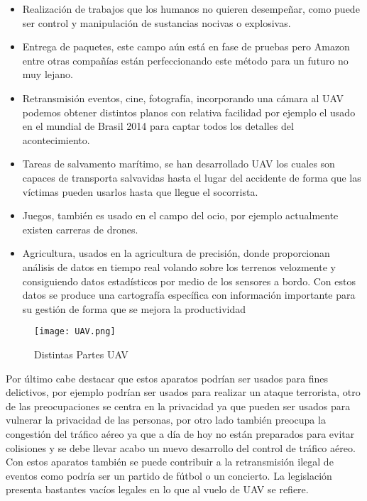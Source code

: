 \begin{itemize}
    \item Realización de trabajos que los humanos no quieren desempeñar, como puede ser control y manipulación de sustancias nocivas o explosivas.
    \item Entrega de paquetes, este campo aún está en fase de pruebas pero Amazon entre otras compañías están perfeccionando este método para un futuro no muy lejano.
    \item Retransmisión eventos, cine, fotografía, incorporando una cámara al UAV podemos obtener distintos planos con relativa facilidad por ejemplo el usado en el mundial de Brasil 2014 para captar todos los detalles del acontecimiento.
    \item Tareas de salvamento marítimo, se han desarrollado UAV los cuales son capaces de transporta salvavidas hasta el lugar del accidente de forma que las víctimas pueden usarlos hasta que llegue el socorrista.
    \item Juegos, también es usado en el campo del ocio, por ejemplo actualmente existen carreras de drones.
    \item Agricultura, usados en la agricultura de precisión, donde proporcionan análisis de datos en tiempo real volando sobre los terrenos velozmente y consiguiendo datos estadísticos por medio de los sensores a bordo. Con estos datos se produce una cartografía específica con información importante para su gestión de forma que se mejora la productividad

\end{itemize}

\begin{figure}[H]
    \centering
    \texttt{[image: UAV.png]}
    \caption{Distintas Partes UAV}
\end{figure}

Por último cabe destacar que estos aparatos podrían ser usados para fines delictivos, por ejemplo podrían ser usados para realizar un ataque terrorista, otro de las preocupaciones se centra en la privacidad ya que pueden ser usados para vulnerar la privacidad de las personas, por otro lado también preocupa la congestión del tráfico aéreo ya que a día de hoy no están preparados para evitar colisiones  y se debe llevar acabo un nuevo desarrollo del control de tráfico aéreo. Con estos aparatos también se puede contribuir a la retransmisión ilegal de eventos como podría ser un partido de fútbol o un concierto. La legislación presenta bastantes vacíos legales en lo que al vuelo de UAV se refiere.

